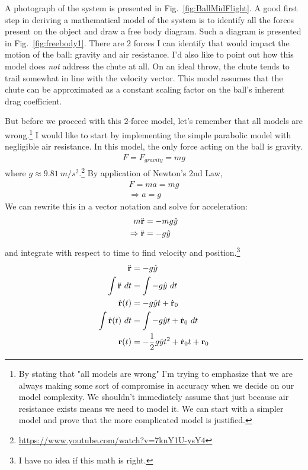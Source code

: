 \documentclass[12pt, letterpaper]{article}
\begin{document}
A photograph of the system is presented in Fig.~\ref{fig:BallMidFlight}. A good first step in deriving a mathematical model of the system is to identify all the forces present on the object and draw a free body diagram. Such a diagram is presented in Fig.~\ref{fig:freebody1}. There are 2 forces I can identify that would impact the motion of the ball: gravity and air resistance. I'd also like to point out how this model does \textit{not} address the chute at all. On an ideal throw, the chute tends to trail somewhat in line with the velocity vector. This model assumes that the chute can be approximated as a constant scaling factor on the ball's inherent drag coefficient. 

But before we proceed with this 2-force model, let's remember that all models are wrong.\footnote{By stating that "all models are wrong" I'm trying to emphasize that we are always making some sort of compromise in accuracy when we decide on our model complexity. We shouldn't immediately assume that just because air resistance exists means we need to model it. We can start with a simpler model and prove that the more complicated model is justified.} I would like to start by implementing the simple parabolic model with negligible air resistance. In this model, the only force acting on the ball is gravity. 
\begin{align*}
F = F_{gravity} = mg
\end{align*}
where $g \approx 9.81\ m/s^2$.\footnote{\href{https://www.youtube.com/watch?v=7knY1U-ysY4}{https://www.youtube.com/watch?v=7knY1U-ysY4}} By application of Newton's 2nd Law,
\begin{align*}
F = ma = mg \\
\Rightarrow a = g
\end{align*}
We can rewrite this in a vector notation and solve for acceleration:
\begin{align*}
m\ddot{\bf r} &= -mg\hat{y} \\
\Rightarrow \ddot{\bf r} &= -g\hat{y}
\end{align*}
and integrate with respect to time to find velocity and position.\footnote{I have no idea if this math is right.}
\begin{align*}
\ddot{\bf r} &= -g\hat{y} \\
\int \ddot{\bf r}\ dt &= \int -g\hat{y}\ dt \\
\dot{\bf r}(t) &= -g\hat{y}t + \dot{\bf r}_0 \\
\int \dot{\bf r}(t)\ dt &= \int -g\hat{y}t + \dot{\bf r}_0\ dt \\
{\bf r}(t) &= -\frac12g\hat{y}t^2 + \dot{\bf r}_0t + {\bf r}_0
\end{align*}
\end{document}
